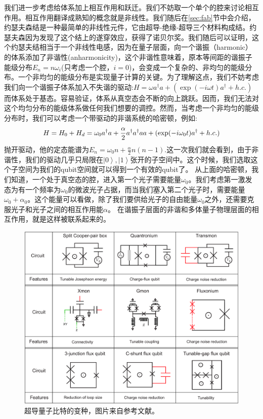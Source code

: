 \documentclass[supercite]{HustGraduPaper}
\newcommand{\ket}[1]{\left| #1 \right\rangle}
\begin{document}
   我们进一步考虑给体系加上相互作用和跃迁。我们不妨取一个单个的腔来讨论相互作用。相互作用翻译成熟知的概念就是非线性。我们随后在\ref{sec:fab}节中会介绍，约瑟夫森结是一种最简单的非线性元件，它由超导-绝缘-超导三个材料构成结。约瑟夫森因为发现了这个结上的遂穿效应，获得了诺贝尔奖\cite{josephson1962possible}。我们随后可以证明，这个约瑟夫结相当于一个非线性电感，因为在量子层面，向一个谐振（harmonic）的体系添加了非谐性(anharmonicity)，这个非谐性意味着，原本等间距的谐振子能级分布$E_n = n \omega_i$(只考虑一个腔，$i =0$)，会变成一个复杂的、非均匀的能级分布。一个非均匀的能级分布是实现量子计算的关键。为了理解这点，我们不妨考虑我们向一个谐振子体系加入不失谐的驱动:$H = \omega a^\dagger a + (\exp(-i\omega t) a^\dagger + h.c.)$而体系处于基态。容易验证，体系从真空态会不断的向上跳跃。因而，我们无法对这个均匀分布的能级体系做任何我们想要的调控。然而，当考虑一个非均匀的能级分布时，我们可以考虑一个带驱动的非谐系统的哈密顿，例如:
\begin{equation}
   H = H_0 + H_d =  \omega_0 a^\dagger a + {\alpha \over 2} a^\dagger a^\dagger a a + (\exp(-i\omega _0t) a^\dagger + h.c.)
\end{equation}
   抛开驱动，他的定态能谱为$E_n = \omega_0 n + \frac{\alpha}{2} n(n-1)$.这一次我们就会看到，由于非谐性，我们的驱动几乎只局限在$\ket{0},\ket{1}$张开的子空间中。这个时候，我们选取这个子空间为我们的qubit空间就可以得到一个有效的qubit了。 从上面的哈密顿，我们知道，一个处于真空态的腔，进入第一个光子需要能量$\omega_0$。我们考虑第一激发态为有一个频率为$\omega_0$的微波光子占据，而当我们塞入第二个光子时，需要能量$\omega_0 + \alpha_0$。这个能量可以看做，除了我们要供给光子的自由能量$\omega_0$之外，还需要克服光子和光子之间的相互作用能$\alpha$。 在谐振子层面的非谐和多体量子物理层面的相互作用，就是这样被联系起来的\cite{GU20171}。
   
   \begin{figure}
   	\centering
   	\includegraphics[width=1\linewidth]{Figures/review/QubitExtensions}
   	\caption{超导量子比特的变种，图片来自参考文献\cite{GU20171}。}
   	\label{fig:qubitextensions}
   \end{figure}
   
\end{document}
